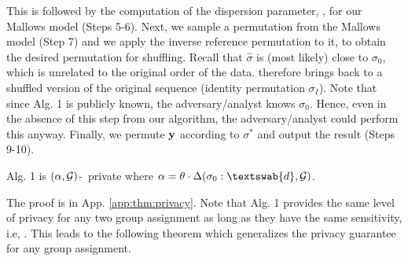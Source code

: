 This is followed by the computation of the dispersion parameter, \scalebox{0.9}{$\theta$}, for our Mallows model (Steps 5-6). 
Next, we sample a permutation from the Mallows model (Step 7)  and we apply the inverse reference permutation to it,  to obtain the desired permutation for shuffling. Recall that $\hat{\sigma}$ is (most likely) close to $\sigma_0$, which is unrelated to the original order of the data.  therefore brings \scalebox{0.9}{$\sigma^*$} back to a shuffled version of the original sequence (identity permutation $\sigma_I$). Note that since Alg. 1 is publicly known, the adversary/analyst knows $\sigma_0$. Hence, even in the absence of this step from our algorithm, the adversary/analyst could perform this anyway. Finally, we permute $\mathbf{y}$ according to $\sigma^*$ and output the result \scalebox{0.9}{$\bz = \hat{\sigma}(\by)$} (Steps 9-10).  
\begin{thm} Alg. 1 is $(\alpha,\mathcal{G})$-\name~private where $\alpha = \theta \cdot \Delta(\sigma_0 : \textswab{d}, \calG)$.
\label{thm:privacy} 
\end{thm} 
The proof is in App. \ref{app:thm:privacy}.
Note that Alg.  1 provides the same level of privacy \scalebox{0.9}{$(\alpha)$} for any two group assignment \scalebox{0.9}{$\calG, \calG'$} as long as they have the same sensitivity, i.e, . This leads to the following theorem which generalizes the privacy guarantee for any group assignment. 

